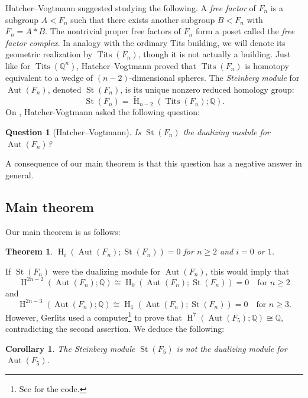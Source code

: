 \documentclass[11pt]{amsart}
\numberwithin{equation}{section}
\theoremstyle{plain}
\newtheorem{maintheorem}{Theorem}
\newtheorem{corollary}[theorem]{Corollary}
\newtheorem{question}[theorem]{Question}
\theoremstyle{definition}
\theoremstyle{remark}
\newcommand\Q{\ensuremath{\mathbb{Q}}}
\DeclareMathOperator{\HH}{H}
\newcommand\RH{\ensuremath{\widetilde{\HH}}}
\DeclareMathOperator{\Aut}{Aut}
\DeclareMathOperator{\Tits}{Tits}
\DeclareMathOperator{\St}{St}
\begin{document}
Hatcher--Vogtmann \cite{HatcherVogtmann, HatcherVogtmannRevised} suggested studying the following.  A {\em free factor} of $F_n$
is a subgroup $A < F_n$ such that there exists another subgroup $B<F_n$ with $F_n = A \ast B$.  The
nontrivial proper free factors of $F_n$ form a poset called the {\em free factor complex}.
In analogy with the ordinary Tits building, we will denote its geometric realization by $\Tits(F_n)$, though
it is not actually a building.  Just like for $\Tits(\Q^n)$, Hatcher--Vogtmann \cite{HatcherVogtmann, HatcherVogtmannRevised}
proved that $\Tits(F_n)$ is homotopy equivalent to a wedge of $(n-2)$-dimensional spheres.
The {\em Steinberg module} for $\Aut(F_n)$, denoted $\St(F_n)$, is its unique nonzero reduced
homology group:
\[\St(F_n) = \RH_{n-2}(\Tits(F_n);\Q).\]
On \cite[p.\ 1]{HatcherVogtmann, HatcherVogtmannRevised}, Hatcher-Vogtmann asked the following question:

\begin{question}[Hatcher--Vogtmann]
\label{question:hatchervogtmann}
Is $\St(F_n)$ the dualizing module for $\Aut(F_n)$?
\end{question}

A consequence of our main theorem is that this question has a negative answer in general.

\subsection{Main theorem}
Our main theorem is as follows:

\begin{maintheorem}
\label{maintheorem:steinberghomology}
$\HH_i(\Aut(F_n);\St(F_n)) = 0$ for $n \geq 2$ and $i=0$ or $1$.
\end{maintheorem}

If $\St(F_n)$ were the dualizing module for $\Aut(F_n)$, this would imply that
\[\HH^{2n-2}(\Aut(F_n);\Q) \cong \HH_0(\Aut(F_n);\St(F_n)) = 0 \quad \text{for $n \geq 2$}\]
and
\[\HH^{2n-3}(\Aut(F_n);\Q) \cong \HH_1(\Aut(F_n);\St(F_n)) = 0 \quad \text{for $n \geq 3$}.\]
However, Gerlits \cite{GerlitsThesis} used a computer\footnote{See \cite{GerlitsCode} for the code.} to prove that
$\HH^7(\Aut(F_5);\Q) \cong \Q$, contradicting the second assertion.  We deduce the following:

\begin{corollary}
The Steinberg module $\St(F_5)$ is not the dualizing module for $\Aut(F_5)$.
\end{corollary}
\end{document}
